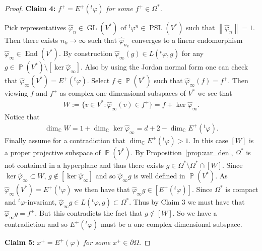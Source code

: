 \documentclass[12pt]{amsart}
\theoremstyle{plain}
\theoremstyle{definition}
\theoremstyle{remark}
\begin{document}
\begin{proof}
\noindent \textbf{Claim 4:} \textit{$f^+ = E^+(^t\varphi)$ for some $f^+ \in \Omega^*$.}\vspace*{5pt}

Pick representatives $\hat{\varphi}_n \in \operatorname{GL}(V^*)$ of $^t\varphi^{n} \in \operatorname{PSL}(V^*)$ such that ${\left\|{\hat{\varphi}_n}\right\|}=1$. Then there exists $n_k \rightarrow \infty$ such that $\hat{\varphi}_{n_k}$ converges to a linear endomorphism $\hat{\varphi}_\infty \in \operatorname{End}(V^*)$.  By construction $\hat{\varphi}_{\infty}(g) \in L(^t\varphi,g)$ for any $g \in \operatorname{\mathbb{P}}(V^*) \setminus [\ker \hat{\varphi}_{\infty}]$. Also by using the Jordan normal form one can check that $\hat{\varphi}_\infty(V^*)=E^+(^t\varphi)$. Select $f \in \operatorname{\mathbb{P}}(V^*)$ such that $\hat{\varphi}_{\infty}(f)=f^+$. Then viewing $f$ and $f^+$ as complex one dimensional subspaces of $V^*$ we see that 
\begin{align*}
W:=\{ v \in V^* : \hat{\varphi}_{\infty}(v) \in f^+\} = f + \ker \hat{\varphi}_{\infty}.
\end{align*}
Notice that 
\begin{align*}
\operatorname{dim}_\operatorname{\mathbb{C}} W = 1 + \operatorname{dim}_\operatorname{\mathbb{C}} \ker \hat{\varphi}_{\infty} = d+2-\operatorname{dim}_\operatorname{\mathbb{C}} E^+(^t\varphi).
\end{align*}
Finally assume for a contradiction that $\operatorname{dim}_\operatorname{\mathbb{C}} E^+(^t\varphi) > 1$. In this case $[W]$ is a proper projective subspace of $\operatorname{\mathbb{P}}(V^*)$. By Proposition~\ref{prop:zar_den}, $\Omega^*$ is not contained in a hyperplane and thus there exists $g \in \Omega^* \setminus \Omega^* \cap [W]$. Since $\ker \hat{\varphi}_{\infty} \subset W$, $g \notin [\ker \hat{\varphi}_{\infty}]$ and so $\hat{\varphi}_{\infty}g$ is well defined in $\operatorname{\mathbb{P}}(V^*)$. As $\hat{\varphi}_{\infty}(V^*) = E^+(^t\varphi)$ we then have that $\hat{\varphi}_{\infty}g \in [E^+(^t\varphi)]$. Since $\Omega^*$ is compact and $^t\varphi$-invariant, $\hat{\varphi}_{\infty}g \in L(^t\varphi,g) \subset \Omega^*$.
Thus by Claim 3 we must have that $\hat{\varphi}_{\infty}g = f^+$. But this contradicts the fact that $g \notin [W]$. So we have a contradiction and so $E^+(^t\varphi)$ must be a one complex dimensional subspace.\vspace*{5pt}

\noindent \textbf{Claim 5:} \textit{$x^+ = E^+(\varphi)$ for some $x^+ \in \partial\Omega$.}\vspace*{5pt}


\end{proof}
\end{document}
